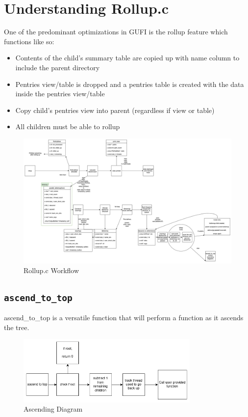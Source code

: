 \section{Understanding Rollup.c}
One of the predominant optimizations in GUFI is the rollup feature which functions like so: \\
\begin{itemize}
  \item Contents of the child's summary table are copied up with name column to include the parent directory
  \item Pentries view/table is dropped and a pentries table is created with the data inside the pentries view/table
  \item Copy child's pentries view into parent (regardless if view or table)
  \item All children must be able to rollup
\end{itemize}


\begin{figure} [h]
\centering
\includegraphics[width=1.2\textwidth]{images/rollup.png}
\caption{\label{fig:rollup}Rollup.c Workflow}
\end{figure}

\clearpage

\subsection{\texttt {ascend\_to\_top}}
ascend\_to\_top is a versatile function that will perform a function as it ascends the tree.

\begin{figure} [h]
\centering
\includegraphics[width=0.8\textwidth]{images/ascending.png}
\caption{\label{fig:ascending_diagram} Ascending Diagram}
\end{figure}


